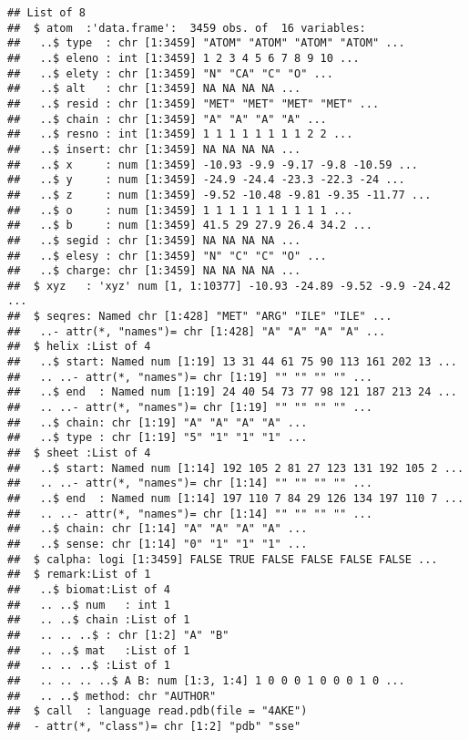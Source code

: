 \documentclass[
]{article}
\newenvironment{Shaded}{\begin{snugshade}}{\end{snugshade}}
\newcommand{\NormalTok}[1]{#1}
\newcommand{\OperatorTok}[1]{\textcolor[rgb]{0.81,0.36,0.00}{\textbf{#1}}}
\begin{document}
\begin{verbatim}
## List of 8
##  $ atom  :'data.frame':  3459 obs. of  16 variables:
##   ..$ type  : chr [1:3459] "ATOM" "ATOM" "ATOM" "ATOM" ...
##   ..$ eleno : int [1:3459] 1 2 3 4 5 6 7 8 9 10 ...
##   ..$ elety : chr [1:3459] "N" "CA" "C" "O" ...
##   ..$ alt   : chr [1:3459] NA NA NA NA ...
##   ..$ resid : chr [1:3459] "MET" "MET" "MET" "MET" ...
##   ..$ chain : chr [1:3459] "A" "A" "A" "A" ...
##   ..$ resno : int [1:3459] 1 1 1 1 1 1 1 1 2 2 ...
##   ..$ insert: chr [1:3459] NA NA NA NA ...
##   ..$ x     : num [1:3459] -10.93 -9.9 -9.17 -9.8 -10.59 ...
##   ..$ y     : num [1:3459] -24.9 -24.4 -23.3 -22.3 -24 ...
##   ..$ z     : num [1:3459] -9.52 -10.48 -9.81 -9.35 -11.77 ...
##   ..$ o     : num [1:3459] 1 1 1 1 1 1 1 1 1 1 ...
##   ..$ b     : num [1:3459] 41.5 29 27.9 26.4 34.2 ...
##   ..$ segid : chr [1:3459] NA NA NA NA ...
##   ..$ elesy : chr [1:3459] "N" "C" "C" "O" ...
##   ..$ charge: chr [1:3459] NA NA NA NA ...
##  $ xyz   : 'xyz' num [1, 1:10377] -10.93 -24.89 -9.52 -9.9 -24.42 ...
##  $ seqres: Named chr [1:428] "MET" "ARG" "ILE" "ILE" ...
##   ..- attr(*, "names")= chr [1:428] "A" "A" "A" "A" ...
##  $ helix :List of 4
##   ..$ start: Named num [1:19] 13 31 44 61 75 90 113 161 202 13 ...
##   .. ..- attr(*, "names")= chr [1:19] "" "" "" "" ...
##   ..$ end  : Named num [1:19] 24 40 54 73 77 98 121 187 213 24 ...
##   .. ..- attr(*, "names")= chr [1:19] "" "" "" "" ...
##   ..$ chain: chr [1:19] "A" "A" "A" "A" ...
##   ..$ type : chr [1:19] "5" "1" "1" "1" ...
##  $ sheet :List of 4
##   ..$ start: Named num [1:14] 192 105 2 81 27 123 131 192 105 2 ...
##   .. ..- attr(*, "names")= chr [1:14] "" "" "" "" ...
##   ..$ end  : Named num [1:14] 197 110 7 84 29 126 134 197 110 7 ...
##   .. ..- attr(*, "names")= chr [1:14] "" "" "" "" ...
##   ..$ chain: chr [1:14] "A" "A" "A" "A" ...
##   ..$ sense: chr [1:14] "0" "1" "1" "1" ...
##  $ calpha: logi [1:3459] FALSE TRUE FALSE FALSE FALSE FALSE ...
##  $ remark:List of 1
##   ..$ biomat:List of 4
##   .. ..$ num   : int 1
##   .. ..$ chain :List of 1
##   .. .. ..$ : chr [1:2] "A" "B"
##   .. ..$ mat   :List of 1
##   .. .. ..$ :List of 1
##   .. .. .. ..$ A B: num [1:3, 1:4] 1 0 0 0 1 0 0 0 1 0 ...
##   .. ..$ method: chr "AUTHOR"
##  $ call  : language read.pdb(file = "4AKE")
##  - attr(*, "class")= chr [1:2] "pdb" "sse"
\end{verbatim}

\begin{Shaded}
\end{Shaded}
\end{document}
